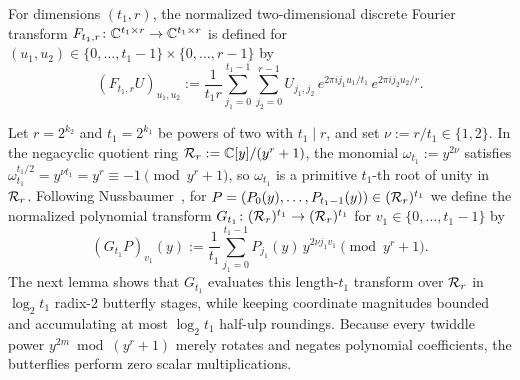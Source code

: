 For dimensions $(t_1, r)$, the normalized two-dimensional discrete Fourier transform $F_{t_1, r}\colon \mathbb{C}^{t_1 \times r} \to \mathbb{C}^{t_1 \times r}$ is defined for $(u_1, u_2) \in \{0, \dots, t_1-1\} \times \{0, \dots, r-1\}$ by
\begin{equation}\label{eq:dft-2d}
  (F_{t_1, r} U)_{u_1, u_2} := \frac{1}{t_1 r} \sum_{j_1=0}^{t_1-1} \sum_{j_2=0}^{r-1} U_{j_1, j_2} \, e^{2\pi i j_1 u_1 / t_1} \, e^{2\pi i j_2 u_2 / r}.
\end{equation}

Let $r = 2^{k_2}$ and $t_1 = 2^{k_1}$ be powers of two with $t_1 \mid r$, and set $\nu := r / t_1 \in \{1, 2\}$. In the negacyclic quotient ring $\mathcal{R}_r := \mathbb{C}[y]/(y^r + 1)$, the monomial $\omega_{t_1} := y^{2\nu}$ satisfies $\omega_{t_1}^{t_1/2} = y^{\nu t_1} = y^r \equiv -1 \pmod{y^r + 1}$, so $\omega_{t_1}$ is a primitive $t_1$-th root of unity in $\mathcal{R}_r$. Following Nussbaumer~\cite{Nussbaumer80,Nussbaumer82}, for $P = (P_0(y), \dots, P_{t_1-1}(y)) \in (\mathcal{R}_r)^{t_1}$ we define the normalized polynomial transform $G_{t_1}\colon (\mathcal{R}_r)^{t_1} \to (\mathcal{R}_r)^{t_1}$ for $v_1 \in \{0, \dots, t_1-1\}$ by
\begin{equation}\label{eq:syn-fft}
  (G_{t_1} P)_{v_1}(y) := \frac{1}{t_1} \sum_{j_1=0}^{t_1-1} P_{j_1}(y) \, y^{2\nu j_1 v_1} \pmod{y^r + 1}.
\end{equation}
The next lemma shows that $G_{t_1}$ evaluates this length-$t_1$ transform over $\mathcal{R}_r$ in $\log_2 t_1$ radix-2 butterfly stages, while keeping coordinate magnitudes bounded and accumulating at most $\log_2 t_1$ half-ulp roundings. Because every twiddle power $y^{2m} \bmod (y^r + 1)$ merely rotates and negates polynomial coefficients, the butterflies perform zero scalar multiplications.

